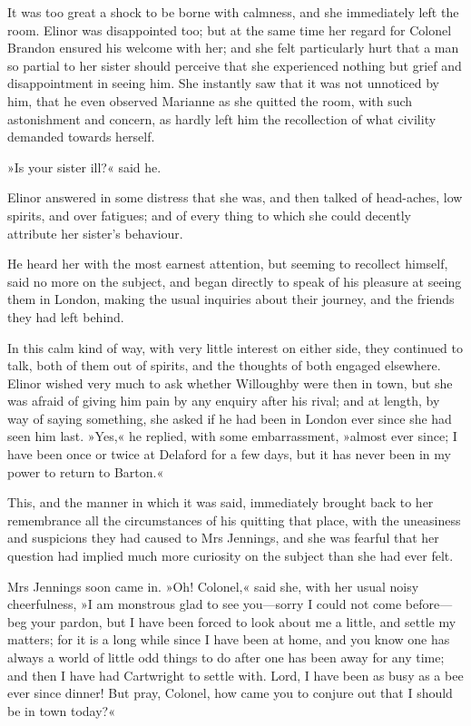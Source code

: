 It was too great a shock to be borne with calmness, and she immediately left the room. Elinor was disappointed too; but at the same time her regard for Colonel Brandon ensured his welcome with her; and she felt particularly hurt that a man so partial to her sister should perceive that she experienced nothing but grief and disappointment in seeing him. She instantly saw that it was not unnoticed by him, that he even observed Marianne as she quitted the room, with such astonishment and concern, as hardly left him the recollection of what civility demanded towards herself.

»Is your sister ill?« said he.

Elinor answered in some distress that she was, and then talked of head-aches, low spirits, and over fatigues; and of every thing to which she could decently attribute her sister’s behaviour.

He heard her with the most earnest attention, but seeming to recollect himself, said no more on the subject, and began directly to speak of his pleasure at seeing them in London, making the usual inquiries about their journey, and the friends they had left behind.

In this calm kind of way, with very little interest on either side, they continued to talk, both of them out of spirits, and the thoughts of both engaged elsewhere. Elinor wished very much to ask whether Willoughby were then in town, but she was afraid of giving him pain by any enquiry after his rival; and at length, by way of saying something, she asked if he had been in London ever since she had seen him last. »Yes,« he replied, with some embarrassment, »almost ever since; I have been once or twice at Delaford for a few days, but it has never been in my power to return to Barton.«

This, and the manner in which it was said, immediately brought back to her remembrance all the circumstances of his quitting that place, with the uneasiness and suspicions they had caused to Mrs Jennings, and she was fearful that her question had implied much more curiosity on the subject than she had ever felt.

Mrs Jennings soon came in. »Oh! Colonel,« said she, with her usual noisy cheerfulness, »I am monstrous glad to see you—sorry I could not come before—beg your pardon, but I have been forced to look about me a little, and settle my matters; for it is a long while since I have been at home, and you know one has always a world of little odd things to do after one has been away for any time; and then I have had Cartwright to settle with. Lord, I have been as busy as a bee ever since dinner! But pray, Colonel, how came you to conjure out that I should be in town today?«

